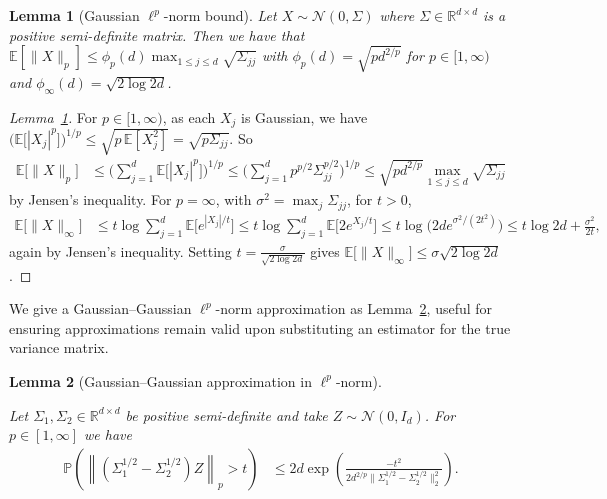 \documentclass[11pt,lof]{puthesis}
\renewcommand{\P}{\ensuremath{\mathbb{P}}}
\newcommand{\R}{\ensuremath{\mathbb{R}}}
\newcommand{\E}{\ensuremath{\mathbb{E}}}
\newcommand{\cN}{\ensuremath{\mathcal{N}}}
\theoremstyle{break}
\newtheorem{lemma}{Lemma}[section]
\theoremstyle{proof}
\newtheorem{proof}{Proof}
\begin{document}
\begin{lemma}[Gaussian \texorpdfstring{$\ell^p$}{lp}-norm bound]%
\label{lem:yurinskii_app_gaussian_pnorm}
Let $X \sim \cN(0, \Sigma)$ where $\Sigma \in \R^{d \times d}$
is a positive semi-definite matrix. Then we have that
$\E\left[ \|X\|_p \right] \leq
\phi_p(d) \max_{1 \leq j \leq d} \sqrt{\Sigma_{j j}}$
with $\phi_p(d) = \sqrt{pd^{2/p} }$ for $p \in [1,\infty)$
and $\phi_\infty(d) = \sqrt{2\log 2d}$.
\end{lemma}

\begin{proof}[Lemma~\ref{lem:yurinskii_app_gaussian_pnorm}]

For $p \in [1, \infty)$,
as each $X_j$ is Gaussian, we have
$\big(\E\big[|X_j|^p\big]\big)^{1/p}
\leq \sqrt{p\, \E[X_j^2]}
= \sqrt{p \Sigma_{j j}}$.
So
%
\begin{align*}
\E\big[\|X\|_p\big]
&\leq
\Bigg(\sum_{j=1}^d \E \big[ |X_j|^p \big] \Bigg)^{1/p}
\leq \Bigg(\sum_{j=1}^d p^{p/2} \Sigma_{j j}^{p/2} \Bigg)^{1/p}
\leq \sqrt{p d^{2/p}}
\max_{1\leq j\leq d}
\sqrt{\Sigma_{j j}}
\end{align*}
%
by Jensen's inequality.
For $p=\infty$,
with $\sigma^2 = \max_j \Sigma_{j j}$,
for $t>0$,
%
\begin{align*}
\E\big[\|X\|_\infty \big]
&\leq
t
\log
\sum_{j=1}^d
\E\Big[
e^{|X_j| / t}
\Big]
\leq
t
\log
\sum_{j=1}^d
\E\Big[
2 e^{X_j / t}
\Big]
\leq t \log \Big(2 d e^{\sigma^2/(2t^2)}\Big)
\leq t \log 2 d + \frac{\sigma^2}{2t},
\end{align*}
%
again by Jensen's inequality.
Setting $t = \frac{\sigma}{\sqrt{2 \log 2d}}$ gives
$\E\big[\|X\|_\infty \big] \leq \sigma \sqrt{2 \log 2d}$.
%
\end{proof}

We give a Gaussian--Gaussian $\ell^p$-norm approximation
as Lemma~\ref{lem:yurinskii_app_feasible_gaussian}, useful for
ensuring approximations remain valid upon substituting
an estimator for the true variance matrix.

\begin{lemma}[Gaussian--Gaussian approximation in
\texorpdfstring{$\ell^p$}{lp}-norm]%
\label{lem:yurinskii_app_feasible_gaussian}

Let $\Sigma_1, \Sigma_2 \in \R^{d \times d}$ be positive semi-definite
and take $Z \sim \cN(0, I_d)$.
For $p \in [1, \infty]$ we have
%
\begin{align*}
\P\left(
\left\|
\left(\Sigma_1^{1/2} - \Sigma_2^{1/2}\right) Z
\right\|_p
> t
\right)
&\leq
2 d \exp \left(
\frac{-t^2}
{2 d^{2/p} \big\|\Sigma_1^{1/2} - \Sigma_2^{1/2}\big\|_2^2}
\right).
\end{align*}

\end{lemma}
\end{document}
